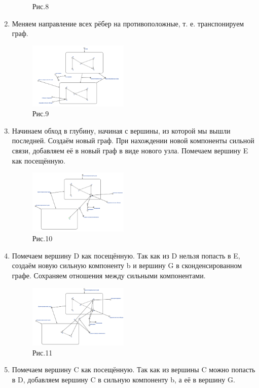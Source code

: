 \documentclass[10pt,a4paper,twocolumn]{article}
\begin{document}
\begin{enumerate}
\begin{figure}[h]
		\caption{Рис.8}
	\end{figure}
	\item Меняем направление всех рёбер на противоположные, т. е. транспонируем граф.
	\begin{figure}[h]
		\includegraphics[width=0.45\textwidth]{img/9.png}
		\caption{Рис.9}
	\end{figure}
	\item Начинаем обход в глубину, начиная с вершины, из которой мы вышли последней. Создаём новый граф. При нахождении новой компоненты сильной связи, добавляем её в новый граф в виде нового узла. Помечаем вершину E как посещённую.
	\begin{figure}[h]
		\includegraphics[width=0.45\textwidth]{img/10.png}
		\caption{Рис.10}
	\end{figure}
    \newpage
	\item Помечаем вершину D как посещённую. Так как из D нельзя попасть в E, создаём новую сильную компоненту b и  вершину G в сконденсированном графе. Сохраняем отношения между сильными компонентами.
	\begin{figure}[h]
		\includegraphics[width=0.45\textwidth]{img/11.png}
		\caption{Рис.11}
	\end{figure}
	\item Помечаем вершину C как посещённую. Так как из вершины C можно попасть в D, добавляем вершину C в сильную компоненту b, а её в вершину G.

\end{enumerate}
\end{document}
